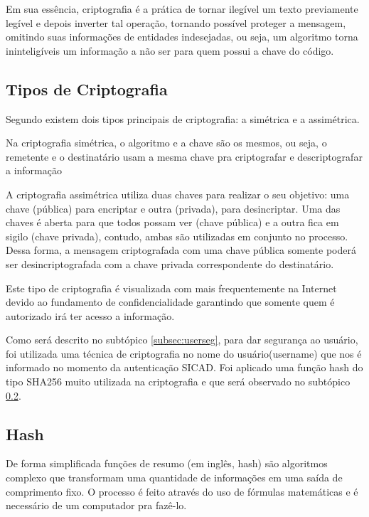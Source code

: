 \documentclass[12pt, a4paper]{report}
\begin{document}
Em sua essência, criptografia é a prática de tornar ilegível um texto previamente legível e depois inverter tal operação, tornando possível proteger a mensagem, omitindo suas informações de entidades indesejadas, ou seja, um algoritmo torna ininteligíveis um informação a não ser para quem possui a chave do código.

\subsection{Tipos de Criptografia}

Segundo \cite{terada2008} existem dois tipos principais de criptografia: a simétrica e a assimétrica. 

Na criptografia simétrica, o algoritmo e a chave são os mesmos, ou seja, o remetente e o destinatário usam a mesma chave pra criptografar e descriptografar a informação

A criptografia assimétrica utiliza duas chaves para realizar o seu objetivo: uma chave (pública) para encriptar e outra (privada), para desincriptar. Uma das chaves é aberta para que todos possam ver (chave pública) e a outra fica em sigilo (chave privada), contudo, ambas são utilizadas em conjunto no processo. Dessa forma, a mensagem criptografada com uma chave pública somente poderá ser desincriptografada com a chave privada correspondente do destinatário.

Este tipo de criptografia é visualizada com mais frequentemente na Internet devido ao fundamento de confidencialidade garantindo que somente quem é autorizado irá ter acesso a informação.

Como será descrito no subtópico \ref{subsec:userseg}, para dar segurança ao usuário, foi utilizada uma técnica de criptografia no nome do usuário(username) que nos é informado no momento da  autenticação SICAD. Foi aplicado uma função hash do tipo SHA256 muito utilizada na criptografia e que será observado no subtópico \ref{subsec:hash}.

\subsection{Hash}
\label{subsec:hash}
De forma simplificada funções de resumo (em inglês, hash) são algoritmos complexo que transformam uma quantidade de informações em uma saída de comprimento fixo. O processo é feito através do uso de fórmulas matemáticas e é necessário de um computador pra fazê-lo.
\end{document}
